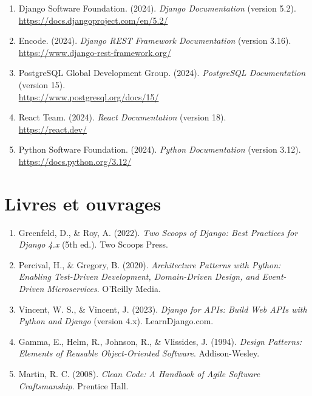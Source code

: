 \begin{enumerate}
    \item Django Software Foundation. (2024). \textit{Django Documentation} (version 5.2). \\
    \url{https://docs.djangoproject.com/en/5.2/}

    \item Encode. (2024). \textit{Django REST Framework Documentation} (version 3.16). \\
    \url{https://www.django-rest-framework.org/}

    \item PostgreSQL Global Development Group. (2024). \textit{PostgreSQL Documentation} (version 15). \\
    \url{https://www.postgresql.org/docs/15/}

    \item React Team. (2024). \textit{React Documentation} (version 18). \\
    \url{https://react.dev/}

    \item Python Software Foundation. (2024). \textit{Python Documentation} (version 3.12). \\
    \url{https://docs.python.org/3.12/}
\end{enumerate}

\section{Livres et ouvrages}

\begin{enumerate}
    \item Greenfeld, D., \& Roy, A. (2022). \textit{Two Scoops of Django: Best Practices for Django 4.x} (5th ed.). Two Scoops Press.

    \item Percival, H., \& Gregory, B. (2020). \textit{Architecture Patterns with Python: Enabling Test-Driven Development, Domain-Driven Design, and Event-Driven Microservices}. O'Reilly Media.

    \item Vincent, W. S., \& Vincent, J. (2023). \textit{Django for APIs: Build Web APIs with Python and Django} (version 4.x). LearnDjango.com.

    \item Gamma, E., Helm, R., Johnson, R., \& Vlissides, J. (1994). \textit{Design Patterns: Elements of Reusable Object-Oriented Software}. Addison-Wesley.

    \item Martin, R. C. (2008). \textit{Clean Code: A Handbook of Agile Software Craftsmanship}. Prentice Hall.
\end{enumerate}

